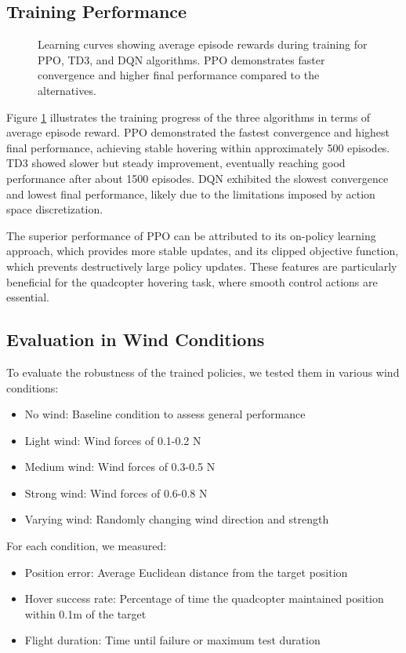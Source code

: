 \documentclass[12pt]{article}
\begin{document}
\subsection{Training Performance}

\begin{figure}[htbp]
\centering
\caption{Learning curves showing average episode rewards during training for PPO, TD3, and DQN algorithms. PPO demonstrates faster convergence and higher final performance compared to the alternatives.}
\label{fig:learning_curves}
\end{figure}

Figure \ref{fig:learning_curves} illustrates the training progress of the three algorithms in terms of average episode reward. PPO demonstrated the fastest convergence and highest final performance, achieving stable hovering within approximately 500 episodes. TD3 showed slower but steady improvement, eventually reaching good performance after about 1500 episodes. DQN exhibited the slowest convergence and lowest final performance, likely due to the limitations imposed by action space discretization.

The superior performance of PPO can be attributed to its on-policy learning approach, which provides more stable updates, and its clipped objective function, which prevents destructively large policy updates. These features are particularly beneficial for the quadcopter hovering task, where smooth control actions are essential.

\subsection{Evaluation in Wind Conditions}

To evaluate the robustness of the trained policies, we tested them in various wind conditions:

\begin{itemize}
    \item No wind: Baseline condition to assess general performance
    \item Light wind: Wind forces of 0.1-0.2 N
    \item Medium wind: Wind forces of 0.3-0.5 N
    \item Strong wind: Wind forces of 0.6-0.8 N
    \item Varying wind: Randomly changing wind direction and strength
\end{itemize}

For each condition, we measured:
\begin{itemize}
    \item Position error: Average Euclidean distance from the target position
    \item Hover success rate: Percentage of time the quadcopter maintained position within 0.1m of the target
    \item Flight duration: Time until failure or maximum test duration
\end{itemize}
\end{document}
